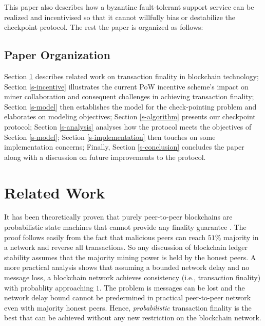 \documentclass[conference]{IEEEtran}
\begin{document}
This paper also describes how a byzantine fault-tolerant support service can be realized and incentivised so that it cannot willfully bias or destabilize the checkpoint protocol. The rest the paper is organized as follows:

\subsection{Paper Organization}
Section \ref{s-related-work} describes related work on transaction finality in blockchain technology; Section \ref{s-incentive} illustrates the current PoW incentive scheme's impact on miner collaboration and consequent challenges in achieving transaction finality; Section \ref{s-model} then establishes the model for the check-pointing problem and elaborates on modeling objectives; Section \ref{s-algorithm} presents our checkpoint protocol; Section \ref{s-analysis} analyses how the protocol meets the objectives of Section \ref{s-model}; Section \ref{s-implementation} then touches on some implementation concerns; Finally, Section \ref{s-conclusion} concludes the paper along with a discussion on future improvements to the protocol.  

\section{Related Work}
\label{s-related-work}
It has been theoretically proven that purely peer-to-peer blockchains are probabilistic state machines that cannot provide any finality guarantee \cite{7756226}. The proof follows easily from the fact that malicious peers can reach $51\%$ majority in a network and reverse all transactions. So any discussion of blockchain ledger stability assumes that the majority mining power is held by the honest peers. A more practical analysis \cite{10.1007/978-3-319-56614-6_22} shows that assuming a bounded network delay and no message loss, a blockchain network achieves consistency (i.e., transaction finality) with probablity approaching $1$. The problem is messages can be lost and the network delay bound cannot be predermined in practical peer-to-peer network even with majority honest peers. Hence, \textit{probabilistic} transaction finality is the best that can be achieved without any new restriction on the blockchain network.
\end{document}
